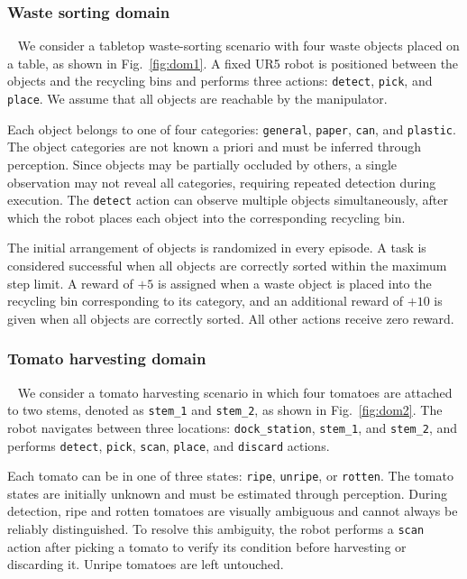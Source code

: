 \subsubsection{Waste sorting domain}~\label{exp:setup_waste}
We consider a tabletop waste-sorting scenario with four waste objects placed on a table, as shown in Fig.~\ref{fig:dom1}. A fixed UR5 robot is positioned between the objects and the recycling bins and performs three actions: \texttt{detect}, \texttt{pick}, and \texttt{place}. We assume that all objects are reachable by the manipulator.

Each object belongs to one of four categories: \texttt{general}, \texttt{paper}, \texttt{can}, and \texttt{plastic}. The object categories are not known a priori and must be inferred through perception. Since objects may be partially occluded by others, a single observation may not reveal all categories, requiring repeated detection during execution. The \texttt{detect} action can observe multiple objects simultaneously, after which the robot places each object into the corresponding recycling bin.

The initial arrangement of objects is randomized in every episode. A task is considered successful when all objects are correctly sorted within the maximum step limit. A reward of $+5$ is assigned when a waste object is placed into the recycling bin corresponding to its category, and an additional reward of $+10$ is given when all objects are correctly sorted. All other actions receive zero reward.



\subsubsection{Tomato harvesting domain}~\label{exp:setup_tomato}
We consider a tomato harvesting scenario in which four tomatoes are attached to two stems, denoted as \texttt{stem\_1} and \texttt{stem\_2}, as shown in Fig.~\ref{fig:dom2}. The robot navigates between three locations: \texttt{dock\_station}, \texttt{stem\_1}, and \texttt{stem\_2}, and performs \texttt{detect}, \texttt{pick}, \texttt{scan}, \texttt{place}, and \texttt{discard} actions.

Each tomato can be in one of three states: \texttt{ripe}, \texttt{unripe}, or \texttt{rotten}. The tomato states are initially unknown and must be estimated through perception. During detection, ripe and rotten tomatoes are visually ambiguous and cannot always be reliably distinguished. To resolve this ambiguity, the robot performs a \texttt{scan} action after picking a tomato to verify its condition before harvesting or discarding it. Unripe tomatoes are left untouched.

